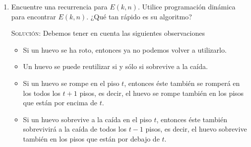 \documentclass[letterpaper,11pt]{article}
\begin{document}
\begin{enumerate}
\begin{enumerate}
        \begin{proof}
            Sin pérdida de generalidad, comenzamos a lanzar el huevo desde el 
            piso $1$. Notemos que debemos lanzar el huevo piso por piso, ya que 
            si lo hacemos de otra manera (digamos, de dos en dos), como sólo 
            tenemos un huevo, entonces no tenemos forma de saber en qué piso se 
            rompe. 
            
            Por otro lado, en el peor caso, tenemos que $f \geq n$, por lo que 
            tenemos dos casos:
            \begin{itemize}
                \item $f = n$. Como subimos piso por piso, entonces hasta que 
                llegamos al piso $n$ sabemos que el huevo se rompe. Por lo 
                tanto, $E(1,n) = n$.

                \item $f > n$. Como subimos piso por piso, al llegar al piso 
                $n$ tenemos que el huevo no se rompe (el problema nos dice 
                que en este caso el huevo nunca se romperá). Pero, como ya no 
                podemos subir más pisos, entonces es suficiente con llegar al 
                $n-$ésimo piso para saber que $f > n$. Por lo tanto, 
                $E(1, n) = n$. 
            \end{itemize}
        \end{proof}

        \item Encuentre una recurrencia para $E(k,n)$. Utilice programación 
        dinámica para encontrar $E(k,n)$. ¿Qué tan rápido es su algoritmo?

        \textsc{Solución:} Debemos tener en cuenta las siguientes 
        observaciones 
        \begin{itemize}
            \item Si un huevo se ha roto, entonces ya no podemos volver a 
            utilizarlo.

            \item Un huevo se puede reutilizar si y sólo si sobrevive a 
            la caída. 

            \item Si un huevo se rompe en el piso $t$, entonces éste también 
            se romperá en los todos los $t+1$ pisos, es decir, el huevo se 
            rompe también en los pisos que están por encima de $t$.

            \item Si un huevo sobrevive a la caída en el piso $t$, entonces 
            éste también sobrevivirá a la caída de todos los $t-1$ pisos, 
            es decir, el huevo sobrevive también en los pisos que están por 
            debajo de $t$. 
        \end{itemize}


\end{enumerate}
\end{enumerate}
\end{document}
